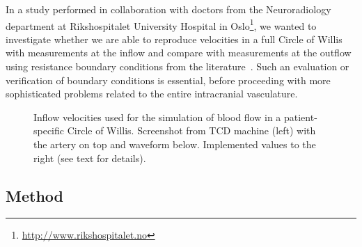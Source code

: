 In a study performed in collaboration with doctors from the
Neuroradiology department at Rikshospitalet University Hospital in
Oslo\footnote{\url{http://www.rikshospitalet.no}}, we wanted to
investigate whether we are able to reproduce velocities in a full
Circle of Willis with measurements at the inflow and compare with
measurements at the outflow using resistance boundary conditions from
the
literature~\citep{AlastrueyParkerPeiroEtAl2007,Vignon-ClementelFigueroaJansenEtAl2006}.
Such an evaluation or verification of boundary conditions is
essential, before proceeding with more sophisticated problems related
to the entire intracranial vasculature.

\begin{figure}
  \begin{center}
  \end{center}
  \caption{Inflow velocities used for the simulation of blood flow in
    a patient-specific Circle of Willis. Screenshot from TCD machine
    (left) with the artery on top and waveform below. Implemented
    values to the right (see text for details).}
  \label{fig:kvs-2:cok_inflow}
\end{figure}

\vspace{1cm}

\subsection{Method}

